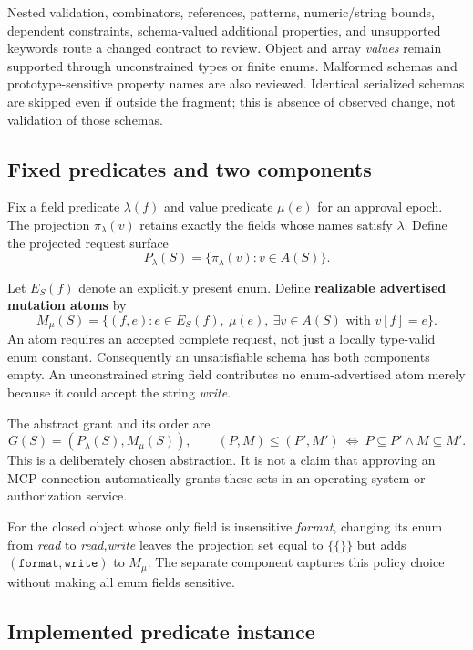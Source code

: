Nested validation, combinators, references, patterns, numeric/string bounds, dependent constraints, schema-valued additional properties, and unsupported keywords route a changed contract to review. Object and array \emph{values} remain supported through unconstrained types or finite enums. Malformed schemas and prototype-sensitive property names are also reviewed. Identical serialized schemas are skipped even if outside the fragment; this is absence of observed change, not validation of those schemas.

\subsection{Fixed predicates and two components}\label{fixed-predicates-and-two-components}

Fix a field predicate \(\lambda(f)\) and value predicate \(\mu(e)\) for an approval epoch. The projection \(\pi_\lambda(v)\) retains exactly the fields whose names satisfy \(\lambda\). Define the projected request surface \[
P_\lambda(S)=\{\pi_\lambda(v):v\in A(S)\}.
\]

Let \(E_S(f)\) denote an explicitly present enum. Define \textbf{realizable advertised mutation atoms} by \[
M_\mu(S)=\{(f,e): e\in E_S(f),\ \mu(e),\
                 \exists v\in A(S)\text{ with }v[f]=e\}.
\] An atom requires an accepted complete request, not just a locally type-valid enum constant. Consequently an unsatisfiable schema has both components empty. An unconstrained string field contributes no enum-advertised atom merely because it could accept the string \emph{write}.

The abstract grant and its order are \[
G(S)=(P_\lambda(S),M_\mu(S)),\qquad
(P,M)\leq(P',M')\ \Longleftrightarrow\ P\subseteq P'\land M\subseteq M'.
\] This is a deliberately chosen abstraction. It is not a claim that approving an MCP connection automatically grants these sets in an operating system or authorization service.

For the closed object whose only field is insensitive \emph{format}, changing its enum from \emph{read} to \emph{read,write} leaves the projection set equal to \(\{\{\}\}\) but adds \((\texttt{format},\texttt{write})\) to \(M_\mu\). The separate component captures this policy choice without making all enum fields sensitive.

\subsection{Implemented predicate instance}\label{implemented-predicate-instance}

